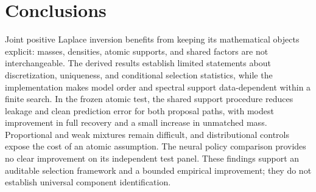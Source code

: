 \section{Conclusions}
Joint positive Laplace inversion benefits from keeping its mathematical objects explicit: masses, densities, atomic supports, and shared factors are not interchangeable. The derived results establish limited statements about discretization, uniqueness, and conditional selection statistics, while the implementation makes model order and spectral support data-dependent within a finite search. In the frozen atomic test, the shared support procedure reduces leakage and clean prediction error for both proposal paths, with modest improvement in full recovery and a small increase in unmatched mass. Proportional and weak mixtures remain difficult, and distributional controls expose the cost of an atomic assumption. The neural policy comparison provides no clear improvement on its independent test panel. These findings support an auditable selection framework and a bounded empirical improvement; they do not establish universal component identification.
